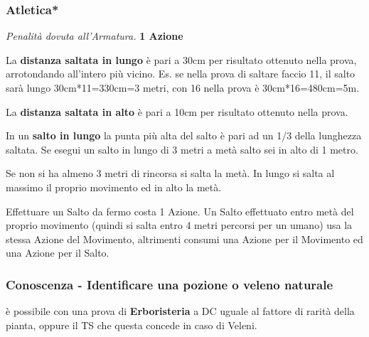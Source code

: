 \begin{multicols}{2}
\titlespacing*{\subsubsection}{0pt}{0.5em}{0.5em}\subsubsection*{Atletica*} \emph{Penalità dovuta all'Armatura.} \textbf{1 Azione}\label{atletica}\label{saltare}

La \textbf{distanza saltata in lungo} è pari a 30cm per risultato ottenuto nella prova, arrotondando all'intero più vicino. Es. se nella prova di saltare faccio 11, il salto sarà lungo 30cm*11=330cm=3 metri, con 16 nella prova è 30cm*16=480cm=5m.

La \textbf{distanza saltata in alto} è pari a 10cm per risultato ottenuto nella prova.

In un \textbf{salto in lungo} la punta più alta del salto è pari ad un 1/3 della lunghezza saltata. Se esegui un salto in lungo di 3 metri a metà salto sei in alto di 1 metro.

Se non si ha almeno 3 metri di rincorsa si salta la metà. In lungo si salta al massimo il proprio movimento ed in alto la metà.

Effettuare un Salto da fermo costa 1 Azione. Un Salto effettuato entro metà del proprio movimento (quindi si salta entro 4 metri percorsi per un umano) usa la stessa Azione del Movimento, altrimenti consumi una Azione per il Movimento ed una Azione per il Salto.

\titlespacing*{\subsubsection}{0pt}{0.5em}{0.5em}\subsubsection*{Conoscenza - Identificare una pozione o veleno naturale} \label{identificarepozioni}
è possibile con una prova di \textbf{Erboristeria} a DC uguale al fattore di rarità della pianta, oppure il TS che questa concede in caso di Veleni.


\end{multicols}
